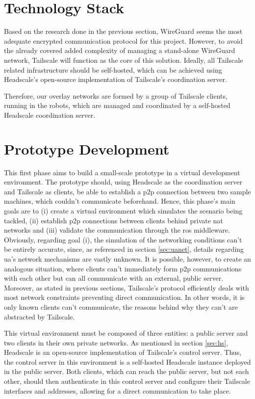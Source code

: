 \documentclass[11pt,twoside,a4paper]{report}
\begin{document}
\section{Technology Stack}

Based on the research done in the previous section, WireGuard seems the most adequate encrypted communication protocol for this project. However, to avoid the already covered added complexity of managing a stand-alone WireGuard network, Tailscale will function as the core of this solution. Ideally, all Tailscale related infrastructure should be self-hosted, which can be achieved using Headscale's open-source implementation of Tailscale's coordination server.

Therefore, our overlay networks are formed by a group of Tailscale clients, running in the robots, which are managed and coordinated by a self-hosted Headscale coordination server.

\section{Prototype Development}
\label{sec:protodev}

This first phase aims to build a small-scale prototype in a virtual development environment. The prototype should, using Headscale as the coordination server and Tailscale as clients, be able to establish a \ac{p2p} connection between two sample machines, which couldn't communicate beforehand. Hence, this phase's main goals are to (i) create a virtual environment which simulates the scenario being tackled, (ii) establish \ac{p2p} connections between clients behind private \ac{nat} networks  and (iii) validate the communication through the \ac{ros} middleware. Obviously, regarding goal (i), the simulation of the networking conditions can't be entirely accurate, since, as referenced in section \ref{sec:uanet}, details regarding \ac{ua}'s network mechanisms are vastly unknown. It is possible, however, to create an analogous situation, where clients can't immediately form \ac{p2p} communications with each other but can all communicate with an external, public server. Moreover, as stated in previous sections, Tailscale's protocol efficiently deals with most network constraints preventing direct communication. In other words, it is only known clients can't communicate, the reasons behind why they can't are abstracted by Tailscale.

This virtual environment must be composed of three entities: a public server and two clients in their own private networks. As mentioned in section \ref{sec:hs}, Headscale is an open-source implementation of Tailscale's control server. Thus, the control server in this environment is a self-hosted Headscale instance deployed in the public server. Both clients, which can reach the public server, but not each other, should then authenticate in this control server and configure their Tailscale interfaces and addresses, allowing for a direct communication to take place.
\end{document}
